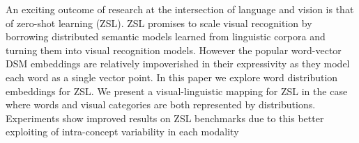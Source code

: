 An exciting outcome of research at the intersection of language and vision is that of zero-shot learning (ZSL). ZSL promises to scale visual recognition by borrowing distributed semantic models learned from linguistic corpora and turning them into visual recognition models. However the popular word-vector DSM embeddings are relatively impoverished in their expressivity as they model each word as a single vector point. In this paper we explore word distribution embeddings for ZSL. We present a visual-linguistic mapping for ZSL in the case where words and visual categories are both represented by distributions. Experiments show improved results on ZSL benchmarks due to this better exploiting of intra-concept variability in each modality
